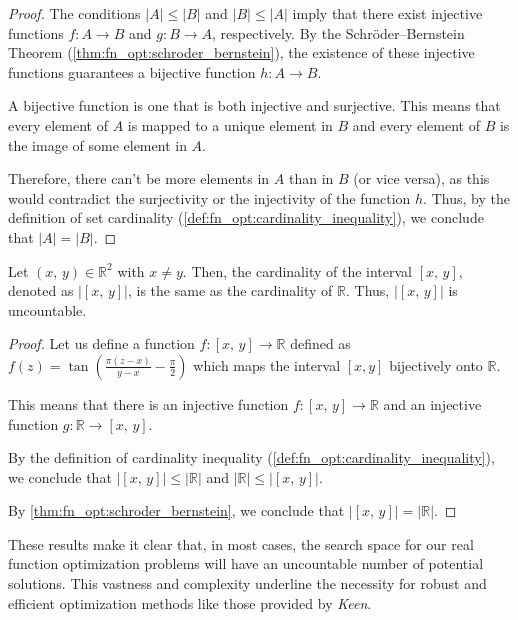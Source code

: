     \begin{proof}
        The conditions \(|A| \leq |B|\) and \(|B| \leq |A|\) imply that there exist injective functions 
        \(f: A \rightarrow B\) and \(g: B \rightarrow A\), respectively. By the Schröder--Bernstein Theorem 
        (\vref{thm:fn_opt:schroder_bernstein}), the existence of these injective functions guarantees a bijective 
        function \(h: A \rightarrow B\).

        A bijective function is one that is both injective and surjective. This means that every element of \(A\) is 
        mapped to a unique element in \(B\) and every element of \(B\) is the image of some element in \(A\).

        Therefore, there can't be more elements in \(A\) than in \(B\) (or vice versa), as this would contradict the 
        surjectivity or the injectivity of the function \(h\). Thus, by the definition of set cardinality 
        (\vref{def:fn_opt:cardinality_inequality}), we conclude that \(|A| = |B|\).
    \end{proof}

    \begin{theorem}
    \label{thm:fn_opt:cardinality}
        Let $(x,\,y) \in \mathbb{R}^2$ with $x \neq y$.
        Then, the cardinality of the interval $[x,\,y]$, denoted as $|[x,\,y]|$,
        is the same as the cardinality of \(\mathbb{R}\).
        Thus, $|[x,\,y]|$ is uncountable.
    \end{theorem}

    \begin{proof}
        Let us define a function \(f: [x,\,y] \rightarrow \mathbb{R}\) defined 
        as \(f(z) = \tan\left(\frac{\pi(z-x)}{y-x} - \frac{\pi}{2}\right)\) 
        which maps the interval \([x, y]\) bijectively onto \(\mathbb{R}\).
        
        This means that there is an injective function \(f: [x,\,y] \rightarrow
        \mathbb{R}\) and an injective function \(g: \mathbb{R} \rightarrow
        [x,\,y]\).

        By the definition of cardinality inequality
        (\vref{def:fn_opt:cardinality_inequality}), we conclude that
        \(|[x,\,y]| \leq |\mathbb{R}|\) and \(|\mathbb{R}| \leq |[x,\,y]|\).

        By \vref{thm:fn_opt:schroder_bernstein}, we conclude that
        \(|[x,\,y]| = |\mathbb{R}|\).
    \end{proof}    

    These results make it clear that, in most cases, the search space for our
    real function optimization problems will have an uncountable number of
    potential solutions.
    This vastness and complexity underline the necessity for robust and
    efficient optimization methods like those provided by \textit{Keen}.